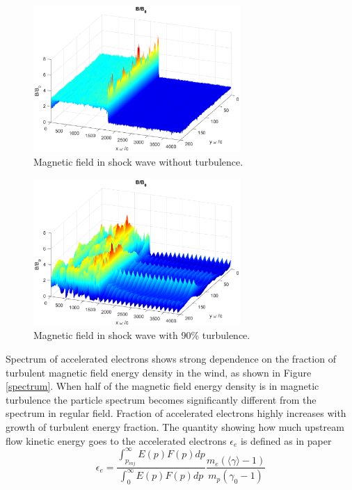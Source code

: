 \documentclass[a4paper]{jpconf}
\begin{document}
\begin{figure}[h!]
		\centering
		\includegraphics[width=0.7\textwidth]{fig/regular_field.eps} 
		\caption{Magnetic field in shock wave without turbulence.}
		\label{regularB}
\end{figure}
\begin{figure}[h!]
		\centering
		\includegraphics[width=0.7\textwidth]{fig/turbulent_field.eps} 
		\caption{Magnetic field in shock wave with 90\% turbulence.}
		\label{turbulentB}
\end{figure}
Spectrum of accelerated electrons shows strong dependence on the fraction of turbulent magnetic field energy density in the wind, as shown in Figure \ref{spectrum}. When half of the magnetic field energy density is in magnetic turbulence the particle spectrum becomes significantly different from the spectrum in regular field. Fraction of accelerated electrons highly increases with growth of turbulent energy fraction. The quantity showing how much upstream flow kinetic energy goes to the accelerated electrons $\epsilon_e$ is defined as in paper \cite{Crumley2019}
\begin{equation}
\epsilon_e = \frac{\int_{p_{inj}}^{\infty}E(p)F(p)dp}{\int_{0}^{\infty}E(p)F(p)dp }\frac{m_e(\langle \gamma \rangle - 1)}{m_p (\gamma_0 - 1)}
\end{equation}
\end{document}
